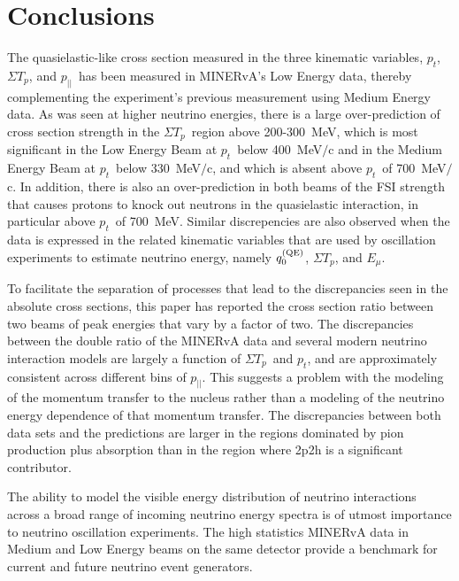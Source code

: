 \documentclass[aps,prl,twocolumn,showpacs,superscriptaddress, floatfix,10pt]{revtex4-2}
\newcommand{\pt}{\ensuremath{p_{t}}}
\newcommand{\pz}{\ensuremath{p_{||}}}
\newcommand{\sumtp}{\ensuremath{\Sigma T_{p}}}
\newcommand{\qzeroqe}{\ensuremath{q_{0}^{\rm\scriptstyle (QE)}}}
\newcommand{\deborahAdd}[1]{{\color{black} \protect #1}}
\begin{document}
\section{Conclusions}

The quasielastic-like cross section measured in the three kinematic variables, \pt, \sumtp, and \pz\ has been measured in MINERvA's Low Energy data, thereby complementing the experiment's previous measurement using Medium Energy data.  %
\deborahAdd{As was seen at higher neutrino energies}, there is a large over-prediction of cross section strength in the \sumtp\ region above 200-300~MeV, which is most significant \deborahAdd{in the Low Energy Beam at \pt\ below 400~MeV$/$c and in the Medium Energy Beam at \pt\ below 330~MeV$/$c}, and which is absent above \pt\ of 700~MeV$/$c.  In addition, there is also an over-prediction in both beams of the FSI strength that causes protons to knock out neutrons in the quasielastic interaction, in particular above \pt\ of 700~MeV.  Similar discrepencies are also observed when the data is expressed in the related kinematic variables that are used by oscillation experiments to estimate neutrino energy, namely \qzeroqe, \sumtp, and $E_\mu$.  

To facilitate the separation of processes that lead to the discrepancies seen in the absolute cross sections, this paper has reported the cross section ratio between two beams of peak energies that vary by a factor of two.  The discrepancies between the double ratio of the MINERvA data and several modern neutrino interaction models are largely a function of \sumtp\ and \pt, and are approximately consistent across different bins of \pz.  This suggests a problem with the modeling of the momentum transfer to the nucleus rather than a modeling of the neutrino energy dependence of that momentum transfer.   
The discrepancies between both data sets and the predictions are larger in the regions dominated by pion production plus absorption than in the region where 2p2h is a significant contributor.

The ability to model the visible energy distribution of neutrino interactions across a broad range of incoming neutrino energy spectra is of utmost importance to neutrino oscillation experiments.  The high statistics MINERvA data in Medium and Low Energy beams on the same detector 
provide a benchmark for current and future neutrino event generators.  
  
\end{document}
